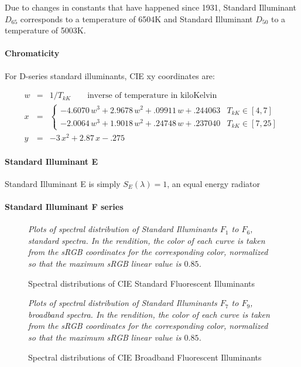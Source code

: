 Due to changes in constants that have happened since 1931, Standard Illuminant $D_{65}$
corresponds to a temperature of \num{6504}\unit{\kelvin} and Standard Illuminant $D_{50}$
to a temperature of \num{5003}\unit{\kelvin}.

\paragraph{Chromaticity}
For D-series standard illuminants, \gls{CIE} xy coordinates are:

\begin{equation}
\begin{array}{rcl}
w & = & 1/T_{kK} \qquad \text{inverse of temperature in kiloKelvin}  \\
x & = & \begin{cases}
         - 4.6070\,w^3 + 2.9678 \,w^2 + .09911\,w + .244063  & T_{kK} \in [4, 7] \\
         - 2.0064\,w^3 + 1.9018\,w^2  +  .24748\,w + .237040 & T_{kK} \in [7, 25]
    \end{cases} \\
y & = & -3\,x^2  + 2.87\,x - .275
\end{array}
\end{equation}


\paragraph{Standard Illuminant E}

Standard Illuminant E is simply $S_E(\lambda) = 1$, an equal energy radiator

\paragraph{Standard Illuminant F series}

\begin{figure}
\small
\centering
\resizebox{\linewidth}{!}{}
\caption{Spectral distributions of CIE Standard Fluorescent Illuminants}
\label{fig:illumfspectrastd}
\vskip 1mm
{\footnotesize\it Plots of spectral distribution of
Standard Illuminants $F_1$ to $F_6$, standard spectra.
In the rendition, the color of each curve is taken from the
sRGB coordinates for the corresponding color,
normalized so that the maximum sRGB linear value is $0.85$.
}
\end{figure}

\begin{figure}
{
\small
\centering
\resizebox{\linewidth}{!}{}
\caption{Spectral distributions of CIE Broadband Fluorescent Illuminants}
\label{fig:illumfspectrabroad}
}
\vskip 1mm
{\footnotesize\it Plots of spectral distribution of
Standard Illuminants $F_7$ to $F_9$, broadband spectra.
In the rendition, the color of each curve is taken from the
sRGB coordinates for the corresponding color,
normalized so that the maximum sRGB linear value is $0.85$.
}
\end{figure}

